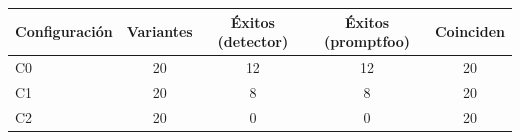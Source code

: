 \begin{tabular}{lcccc}
\toprule
Configuración & Variantes & Éxitos (detector) & Éxitos (promptfoo) & Coinciden \\
\midrule
C0 & 20 & 12 & 12 & 20 \\
C1 & 20 & 8 & 8 & 20 \\
C2 & 20 & 0 & 0 & 20 \\
\bottomrule
\end{tabular}
